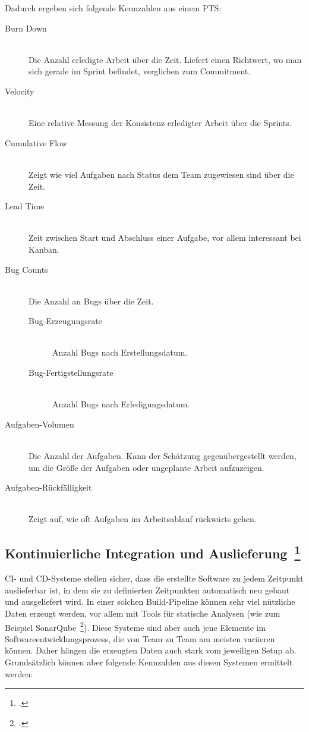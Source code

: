 Dadurch ergeben sich folgende Kennzahlen aus einem \ac{PTS}:
\begin{description}
  \item[Burn Down] \hfill \\ Die Anzahl erledigte Arbeit über die Zeit. Liefert einen Richtwert, wo man sich gerade im Sprint befindet, verglichen zum Commitment.
  \item[Velocity] \hfill \\ Eine relative Messung der Konsistenz erledigter Arbeit über die Sprints.
  \item[Cumulative Flow] \hfill \\ Zeigt wie viel Aufgaben nach Status dem Team zugewiesen sind über die Zeit.
  \item[Lead Time] \hfill \\ Zeit zwischen Start und Abschluss einer Aufgabe, vor allem interessant bei Kanban.
  \item[Bug Counts] \hfill \\ Die Anzahl an Bugs über die Zeit.
  \begin{description}
    \item[Bug-Erzeugungsrate] \hfill \\ Anzahl Bugs nach Erstellungsdatum.
    \item[Bug-Fertigstellungsrate] \hfill \\ Anzahl Bugs nach Erledigungsdatum.
  \end{description}
  \item[Aufgaben-Volumen] \hfill \\ Die Anzahl der Aufgaben. Kann der Schätzung gegenübergestellt werden, um die Größe der Aufgaben oder ungeplante Arbeit aufzuzeigen.
  \item[Aufgaben-Rückfälligkeit] \hfill \\ Zeigt auf, wie oft Aufgaben im Arbeitsablauf rückwärts gehen.
\end{description}

\subsection[Kontinuierliche Integration und Auslieferung]{Kontinuierliche Integration und Auslieferung~\footcite[vgl.][S.84ff]{davis_agile_2015}}

\ac{CI}- und \ac{CD}-Systeme stellen sicher, dass die erstellte Software zu jedem Zeitpunkt auslieferbar ist, in dem sie zu definierten Zeitpunkten automatisch neu gebaut und ausgeliefert wird.
In einer solchen Build-Pipeline können sehr viel nützliche Daten erzeugt werden, vor allem mit Tools für statische Analysen (wie zum Beispiel SonarQube~\footcite[][]{sonarqube}).
Diese Systeme sind aber auch jene Elemente im Softwareentwicklungsprozess, die von Team zu Team am meisten variieren können.
Daher hängen die erzeugten Daten auch stark vom jeweiligen Setup ab.
Grundsätzlich können aber folgende Kennzahlen aus diesen Systemen ermittelt werden:

